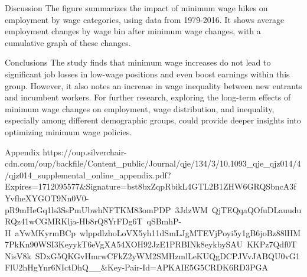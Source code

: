 \documentclass[final]{beamer}
\begin{document}
\begin{frame}[t]
\begin{columns}[T]
\begin{column}{.32\textwidth}
    \begin{block}{\Huge Discussion} %
    \Large %
    The figure summarizes the impact of minimum wage hikes on employment by wage categories, using data from 1979-2016. It shows average employment changes by wage bin after minimum wage changes, with a cumulative graph of these changes.
   
    \end{block}

    \vspace{1cm} %

    \begin{block}{\Huge Conclusions} %
    \Large %
    The study finds that minimum wage increases do not lead to significant job losses in low-wage positions and even boost earnings within this group. However, it also notes an increase in wage inequality between new entrants and incumbent workers. For further research, exploring the long-term effects of minimum wage changes on employment, wage distribution, and inequality, especially among different demographic groups, could provide deeper insights into optimizing minimum wage policies.
    
    \end{block}

    \vspace{1cm} %


    \vspace{1cm} %
                                                  
    \begin{block}{\Huge Appendix} %
    \Large %
https://oup.silverchair-cdn.com/oup/backfile/Content_public/Journal/qje/134/3/10.1093_qje_qjz014/4/qjz014_supplemental_online_appendix.pdf?Expires=1712095577&Signature=bst8bxZqpRbikL4GTL2B1ZHW6GRQSbncA3fYvfheXYGOT9Nn0V0-pR9mHeGq1ls3SsPmUbwhNFTKM83omPDP~3JdzWM~QjTEQqaQOfuDLauuduRQz41wCGMRKlja-Hb8rQ8YrFDg6T~qSBmhP-H~aYwMKyrmBCp~wlppdlzhoLoVX5yh11dSmLJgMTEVjPoyi5y1gB6joBz88lHM7PkKn90WSI3KeyykT6eVgXA54XOH92JzE1PRBINk8eykbySAU~KKPz7Qdf0TNisV8k~SDxG5QKGvHmrwCFkZ2yWM2SMHzmlLeKUQgDCPJVvJABQU0vG1FlU2hHgYnr6NIctDhQ__&Key-Pair-Id=APKAIE5G5CRDK6RD3PGA
    
    \end{block}
\end{column}

\end{columns}
    
\end{frame}
\end{document}
